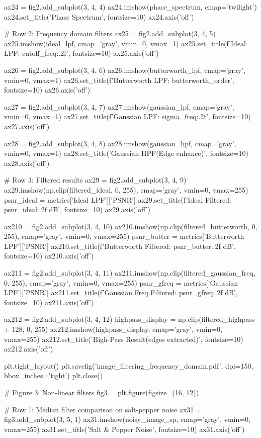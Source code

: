 \documentclass[a4paper, 11pt]{article}
\begin{document}
\begin{pycode}
ax24 = fig2.add_subplot(3, 4, 4)
ax24.imshow(phase_spectrum, cmap='twilight')
ax24.set_title('Phase Spectrum', fontsize=10)
ax24.axis('off')

# Row 2: Frequency domain filters
ax25 = fig2.add_subplot(3, 4, 5)
ax25.imshow(ideal_lpf, cmap='gray', vmin=0, vmax=1)
ax25.set_title(f'Ideal LPF\nCutoff: {cutoff_freq:.2f}', fontsize=10)
ax25.axis('off')

ax26 = fig2.add_subplot(3, 4, 6)
ax26.imshow(butterworth_lpf, cmap='gray', vmin=0, vmax=1)
ax26.set_title(f'Butterworth LPF\nOrder: {butterworth_order}', fontsize=10)
ax26.axis('off')

ax27 = fig2.add_subplot(3, 4, 7)
ax27.imshow(gaussian_lpf, cmap='gray', vmin=0, vmax=1)
ax27.set_title(f'Gaussian LPF: {sigma_freq:.2f}', fontsize=10)
ax27.axis('off')

ax28 = fig2.add_subplot(3, 4, 8)
ax28.imshow(gaussian_hpf, cmap='gray', vmin=0, vmax=1)
ax28.set_title('Gaussian HPF\n(Edge enhance)', fontsize=10)
ax28.axis('off')

# Row 3: Filtered results
ax29 = fig2.add_subplot(3, 4, 9)
ax29.imshow(np.clip(filtered_ideal, 0, 255), cmap='gray', vmin=0, vmax=255)
psnr_ideal = metrics['Ideal LPF']['PSNR']
ax29.set_title(f'Ideal Filtered\nPSNR: {psnr_ideal:.2f} dB', fontsize=10)
ax29.axis('off')

ax210 = fig2.add_subplot(3, 4, 10)
ax210.imshow(np.clip(filtered_butterworth, 0, 255), cmap='gray', vmin=0, vmax=255)
psnr_butter = metrics['Butterworth LPF']['PSNR']
ax210.set_title(f'Butterworth Filtered\nPSNR: {psnr_butter:.2f} dB', fontsize=10)
ax210.axis('off')

ax211 = fig2.add_subplot(3, 4, 11)
ax211.imshow(np.clip(filtered_gaussian_freq, 0, 255), cmap='gray', vmin=0, vmax=255)
psnr_gfreq = metrics['Gaussian LPF']['PSNR']
ax211.set_title(f'Gaussian Freq Filtered\nPSNR: {psnr_gfreq:.2f} dB', fontsize=10)
ax211.axis('off')

ax212 = fig2.add_subplot(3, 4, 12)
highpass_display = np.clip(filtered_highpass + 128, 0, 255)
ax212.imshow(highpass_display, cmap='gray', vmin=0, vmax=255)
ax212.set_title('High-Pass Result\n(edges extracted)', fontsize=10)
ax212.axis('off')

plt.tight_layout()
plt.savefig('image_filtering_frequency_domain.pdf', dpi=150, bbox_inches='tight')
plt.close()

# Figure 3: Non-linear filters
fig3 = plt.figure(figsize=(16, 12))

# Row 1: Median filter comparison on salt-pepper noise
ax31 = fig3.add_subplot(3, 5, 1)
ax31.imshow(noisy_image_sp, cmap='gray', vmin=0, vmax=255)
ax31.set_title('Salt \& Pepper Noise', fontsize=10)
ax31.axis('off')


\end{pycode}
\end{document}
